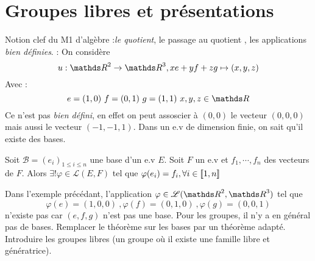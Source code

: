 \chapter{Groupes libres et pr\'{e}sentations}
	Notion clef du M1 d'alg\`{e}bre :\textit{le quotient}, le passage au quotient , les applications \textit{bien d\'{e}finies}.
	: On considère 
	\[ u : \Set{R}^2 \rightarrow \Set{R}^3 , xe + yf + zg \mapsto (x,y,z) \]
	Avec : \[ e = (1,0) \  f = (0,1) \  g = (1,1) \  x,y,z \in \Set{R} \]
	Ce n'est pas \textit{bien défini}, en effet on peut assoscier à $(0,0)$ le vecteur $(0,0,0)$ mais aussi le vecteur $(-1,-1,1)$.
	Dans un e.v de dimension finie, on sait qu'il existe des bases.
	\begin{theorem}
		Soit $\mathscr{B} = (e_i)_{1 \le i \le n}$ une base d'un e.v $E$. Soit $F$ un e.v et $f_1,\cdots,f_n$ des vecteurs de $F$. \newline
		Alors $\exists ! \varphi \in \mathscr{L}(E,F)$ tel que $\varphi(e_i) = f_i , \forall i \in {[\![1,n]\!]}$
	\end{theorem}
	\begin{remark}
		Dans l'exemple pr\'{e}c\'{e}dant, l'application $\varphi \in \mathscr{L}(\Set{R}^2,\Set{R}^3)$ tel que 
		\[ \varphi(e) = (1,0,0) \ , \varphi(f) = (0,1,0) \ , \varphi(g) = (0,0,1) \]
		n'existe pas car $(e,f,g)$ n'est pas une base. Pour les groupes, il n'y a en g\'{e}n\'{e}ral pas de bases. \newline
		 Remplacer le th\'{e}or\`{e}me sur les bases par un th\'{e}or\`{e}me adapt\'{e}. Introduire les groupes
		libres (un groupe o\`{u} il existe une famille libre et g\'{e}n\'{e}ratrice).
    \end{remark} 
	
